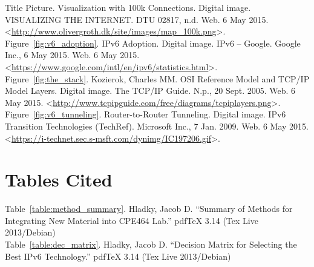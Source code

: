 \documentclass[12pt]{article}
\begin{document}
\begin{hangparas}{0.25in}{1}
Title Picture. Visualization with 100k Connections. Digital image. VISUALIZING THE INTERNET. DTU 02817, n.d. Web. 6 May 2015. <\url{http://www.olivergroth.dk/site/images/map_100k.png}>.\\

Figure~\ref{fig:v6_adoption}. IPv6 Adoption. Digital image. IPv6 -- Google. Google Inc., 6 May 2015. Web. 6 May 2015. <\url{https://www.google.com/intl/en/ipv6/statistics.html}>.\\

Figure~\ref{fig:the_stack}. Kozierok, Charles MM. OSI Reference Model and TCP/IP Model Layers. Digital image. The TCP/IP Guide. N.p., 20 Sept. 2005. Web. 6 May 2015. <\url{http://www.tcpipguide.com/free/diagrams/tcpiplayers.png}>.\\

Figure~\ref{fig:v6_tunneling}. Router-to-Router Tunneling. Digital image. IPv6 Transition Technologies (TechRef). Microsoft Inc., 7 Jan. 2009. Web. 6 May 2015. <\url{https://i-technet.sec.s-msft.com/dynimg/IC197206.gif}>.
\end{hangparas}

\bigskip
\section{Tables Cited}

\begin{hangparas}{0.25in}{1}
Table~\ref{table:method_summary}. Hladky, Jacob D. ``Summary of Methods for Integrating New Material into CPE464 Lab.'' pdfTeX 3.14 (Tex Live 2013/Debian) \\

Table~\ref{table:dec_matrix}. Hladky, Jacob D. ``Decision Matrix for Selecting the Best IPv6 Technology.'' pdfTeX 3.14 (Tex Live 2013/Debian)
\end{hangparas}

\endgroup
\end{document}
